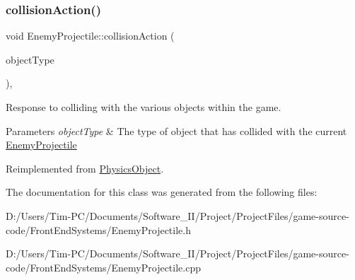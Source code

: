\subsubsection{\texorpdfstring{collision\+Action()}{collisionAction()}}
{\footnotesize\ttfamily void Enemy\+Projectile\+::collision\+Action (\begin{DoxyParamCaption}\item[{const Game\+Object\+Type \&}]{object\+Type }\end{DoxyParamCaption})\hspace{0.3cm}{\ttfamily [override]}, {\ttfamily [virtual]}}



Response to colliding with the various objects within the game. 


\begin{DoxyParams}{Parameters}
{\em object\+Type} & The type of object that has collided with the current \hyperlink{class_enemy_projectile}{Enemy\+Projectile} \\
\hline
\end{DoxyParams}


Reimplemented from \hyperlink{class_physics_object_a16163f4e5bf781b3814d024c9f44a276}{Physics\+Object}.



The documentation for this class was generated from the following files\+:\begin{DoxyCompactItemize}
\item 
D\+:/\+Users/\+Tim-\/\+P\+C/\+Documents/\+Software\+\_\+\+I\+I/\+Project/\+Project\+Files/game-\/source-\/code/\+Front\+End\+Systems/Enemy\+Projectile.\+h\item 
D\+:/\+Users/\+Tim-\/\+P\+C/\+Documents/\+Software\+\_\+\+I\+I/\+Project/\+Project\+Files/game-\/source-\/code/\+Front\+End\+Systems/Enemy\+Projectile.\+cpp\end{DoxyCompactItemize}
